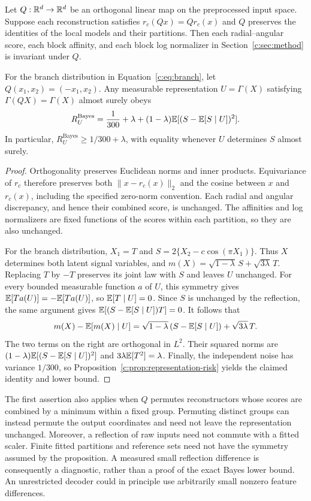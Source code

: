 \begin{proposition}
\label{c:prop:exact-symmetry}
Let $Q:\mathbb{R}^d\to\mathbb{R}^d$ be an orthogonal linear map on the preprocessed
input space. Suppose each reconstruction satisfies
$r_c(Qx)=Qr_c(x)$ and $Q$ preserves the identities of the local models
and their partitions. Then each radial--angular score, each block
affinity, and each block log normalizer in Section~\ref{c:sec:method}
is invariant under $Q$.

For the branch distribution in Equation~\eqref{c:eq:branch}, let
$Q(x_1,x_2)=(-x_1,x_2)$. Any measurable representation $U=\Gamma(X)$
satisfying $\Gamma(QX)=\Gamma(X)$ almost surely obeys
\[
 R_U^{\mathrm{Bayes}}
 =\frac{1}{300}+\lambda
 +(1-\lambda)\mathbb{E}[(S-\mathbb{E}[S\mid U])^2].
\]
In particular, $R_U^{\mathrm{Bayes}}\geq1/300+\lambda$, with equality
whenever $U$ determines $S$ almost surely.
\end{proposition}
\begin{proof}
Orthogonality preserves Euclidean norms and inner products. Equivariance
of $r_c$ therefore preserves both
$\|x-r_c(x)\|_2$ and the cosine between $x$ and $r_c(x)$, including the
specified zero-norm convention. Each radial and angular discrepancy,
and hence their combined score, is unchanged. The affinities and log
normalizers are fixed functions of the scores within each partition,
so they are also unchanged.

For the branch distribution, $X_1=T$ and
$S=2\{X_2-c\cos(\pi X_1)\}$. Thus $X$ determines both latent signal
variables, and
$m(X)=\sqrt{1-\lambda}\,S+\sqrt{3\lambda}\,T$. Replacing $T$ by $-T$
preserves its joint law with $S$ and leaves $U$ unchanged. For every
bounded measurable function $a$ of $U$, this symmetry gives
$\mathbb{E}[T a(U)]=-\mathbb{E}[T a(U)]$, so $\mathbb{E}[T\mid U]=0$. Since $S$ is unchanged
by the reflection, the same argument gives
$\mathbb{E}[(S-\mathbb{E}[S\mid U])T]=0$. It follows that
\[
 m(X)-\mathbb{E}[m(X)\mid U]
 =\sqrt{1-\lambda}\,(S-\mathbb{E}[S\mid U])+\sqrt{3\lambda}\,T.
\]
The two terms on the right are orthogonal in $L^2$. Their squared
norms are $(1-\lambda)\mathbb{E}[(S-\mathbb{E}[S\mid U])^2]$ and
$3\lambda\mathbb{E}[T^2]=\lambda$. Finally, the independent noise has variance
$1/300$, so Proposition~\ref{c:prop:representation-risk} yields the
claimed identity and lower bound.
\end{proof}

The first assertion also applies when $Q$ permutes reconstructors whose
scores are combined by a minimum within a fixed group. Permuting distinct
groups can instead permute the output coordinates and need not leave the
representation unchanged. Moreover, a reflection of raw inputs need not
commute with a fitted scaler. Finite fitted partitions and reference sets
need not have the symmetry assumed by the proposition. A measured small
reflection difference is consequently a diagnostic, rather than a proof
of the exact Bayes lower bound. An unrestricted decoder could in principle
use arbitrarily small nonzero feature differences.

